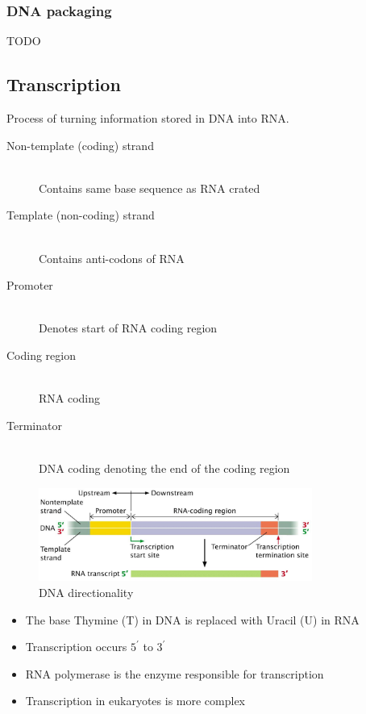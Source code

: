 \documentclass[a4paper]{article}
\begin{document}
\subsubsection{DNA packaging}

TODO

\subsection{Transcription}

Process of turning information stored in DNA into RNA.

\begin{description}
  \item[Non-template (coding) strand] \hfill \\
    Contains same base sequence as RNA crated
  \item[Template (non-coding) strand] \hfill \\
    Contains anti-codons of RNA
  \item[Promoter] \hfill \\
    Denotes start of RNA coding region
  \item[Coding region] \hfill \\
    RNA coding
  \item[Terminator] \hfill \\
    DNA coding denoting the end of the coding region
\end{description}

\begin{figure}[h!]
  \centering
  \includegraphics[width=0.8\textwidth]{graphics/dna-rna_transcription.eps}
  \caption{DNA directionality}
  \label{fig:eukaryotic_cell}
\end{figure}
\FloatBarrier

\begin{itemize}
  \item The base Thymine (T) in DNA is replaced with Uracil (U) in RNA
  \item Transcription occurs $5^{\prime}$ to $3^{\prime}$
  \item RNA polymerase is the enzyme responsible for transcription
  \item Transcription in eukaryotes is more complex
\end{itemize}
\end{document}
